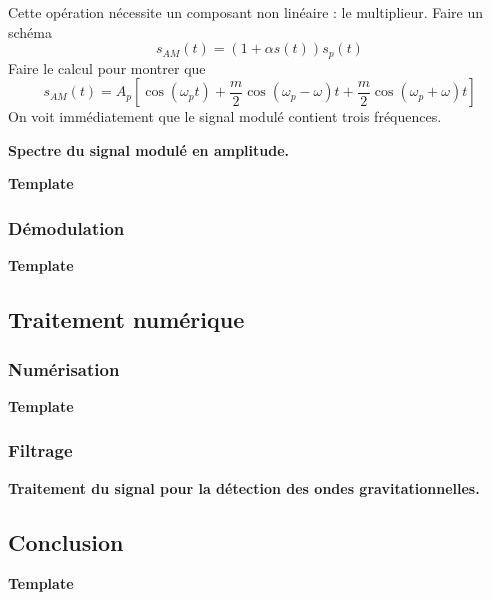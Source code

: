 Cette opération nécessite un composant non linéaire : le multiplieur.
Faire un schéma
\begin{equation}
s_{AM}(t) = (1+\alpha s(t))s_p(t)
\end{equation}
Faire le calcul pour montrer que 
\begin{equation}
s_{AM}(t) = A_p \left[ \cos(\omega_p t) + \frac{m}{2}\cos(\omega_p-\omega)t + \frac{m}{2}\cos(\omega_p+\omega)t \right] 
\end{equation}
On voit immédiatement que le signal modulé contient trois fréquences.

\begin{slide}
\textbf{Spectre du signal modulé en amplitude.}
\end{slide}

\begin{transition}
\textbf{Template}
\end{transition}

\subsubsection{Démodulation}

\begin{transition}
\textbf{Template}
\end{transition}

\subsection{Traitement numérique}

\subsubsection{Numérisation}

\begin{transition}
\textbf{Template}
\end{transition}

\subsubsection{Filtrage}

\begin{slide}
\textbf{Traitement du signal pour la détection des ondes gravitationnelles.}
\end{slide}

\subsection*{Conclusion}


\begin{remarque}
\textbf{Template}
\end{remarque}

\newpage